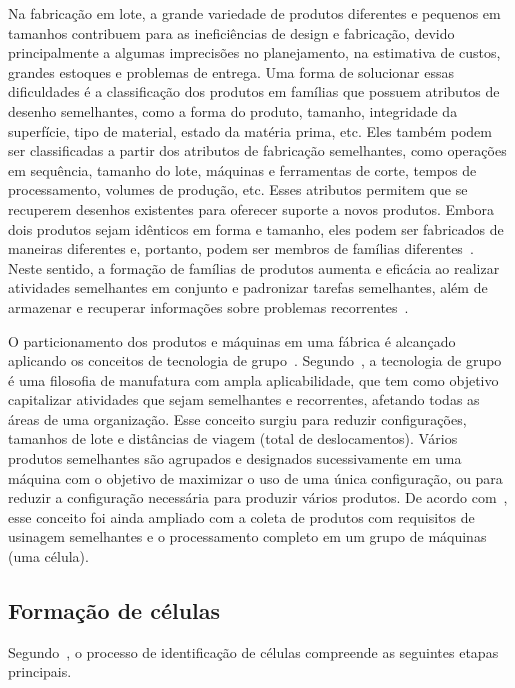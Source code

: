 Na fabricação em lote, a grande variedade de produtos diferentes e pequenos em tamanhos contribuem para as ineficiências de design e fabricação, devido principalmente a algumas imprecisões no planejamento, na estimativa de custos, grandes estoques e problemas de entrega. Uma forma de solucionar essas dificuldades é a classificação dos produtos em famílias que possuem atributos de desenho semelhantes, como a forma do produto, tamanho, integridade da superfície, tipo de material, estado da matéria prima, etc. Eles também podem ser classificadas a partir dos atributos de fabricação semelhantes, como operações em sequência, tamanho do lote, máquinas e ferramentas de corte, tempos de processamento, volumes de produção, etc. Esses atributos permitem que se recuperem desenhos existentes para oferecer suporte a novos produtos. Embora dois produtos sejam idênticos em forma e tamanho, eles podem ser fabricados de maneiras diferentes e, portanto, podem ser membros de famílias diferentes~\citep{singh2012cellular}. Neste sentido, a formação de famílias de produtos aumenta e eficácia ao realizar atividades semelhantes em conjunto e padronizar tarefas semelhantes, além de armazenar e recuperar informações sobre problemas recorrentes~\citep{hyer1984group}. 

O particionamento dos produtos e máquinas em uma fábrica é alcançado aplicando os conceitos de tecnologia de grupo~\citep{choobineh1988framework}. Segundo~\cite{irani1999handbook}, a tecnologia de grupo é uma filosofia de manufatura com ampla aplicabilidade, que tem como objetivo capitalizar atividades que sejam semelhantes e recorrentes, afetando todas as áreas de uma organização. Esse conceito surgiu para reduzir configurações, tamanhos de lote e distâncias de viagem (total de deslocamentos). Vários produtos semelhantes são agrupados e designados sucessivamente em uma máquina com o objetivo de maximizar o uso de uma única configuração, ou para reduzir a configuração necessária para produzir vários produtos. De acordo com~\cite{singh2012cellular}, esse conceito foi ainda ampliado com a coleta de produtos com requisitos de usinagem semelhantes e o processamento completo em um grupo de máquinas (uma célula). 

\subsection{Formação de células}

Segundo~\cite{irani1999handbook}, o processo de identificação de células compreende as seguintes etapas principais. 

